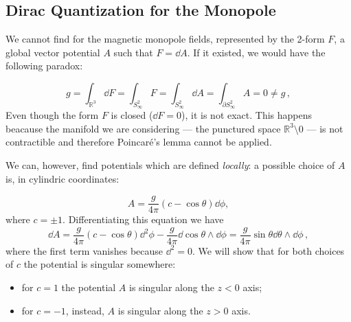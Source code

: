 \documentclass[main.tex]{subfiles}
\begin{document}
\subsection{Dirac Quantization for the Monopole}
We cannot find for the magnetic monopole fields, represented by the 2-form $F$, a global vector potential $A$ such that $F=\dd{A}$.  If it existed, we would have the following paradox:

\begin{equation} \label{eq:different-potentials}
 g= \int_{\mathbb R^3} \dd{F}
= \int_{S^2_\infty} F
 =\int_{S^2_\infty}\dd{A}=\int_{\partial S^2_\infty}A=0 \neq g\,,
\end{equation}
%
Even though the form \(F\) is closed ($\dd{F}=0$), it is not exact. This happens beacause the manifold we are considering --- the punctured space $\mathbb R ^3 \setminus \qty{0}$ --- is not contractible and therefore Poincaré's lemma cannot be applied.



We can, however, find potentials which are defined \emph{locally}: a possible choice of $A$ is, in cylindric coordinates:

\begin{equation}
A=\frac{g}{4\pi}\left(c-\cos\theta\right)\dd{\phi},
\end{equation}
where $c = \pm 1$. Differentiating this equation we have
%
\begin{equation}
\dd{A}=\frac{g}{4\pi}\left(c-\cos\theta\right)\dd^2\phi-\frac{g}{4\pi}\dd{\cos\theta}\wedge \dd{\phi}=\frac{g}{4\pi}\sin\theta \dd{\theta}\wedge \dd{\phi}\,,
\end{equation}
where the first term vanishes because \(\dd^2 = 0\).
%
We will show that for both choices of $c$ the potential is singular somewhere:
%
\begin{itemize}
\item for $c=1$ the potential \(A\) is singular along the \(z<0\) axis;
\item for $c=-1$, instead, \(A\) is singular along the \(z>0\) axis.
\end{itemize}
\end{document}

